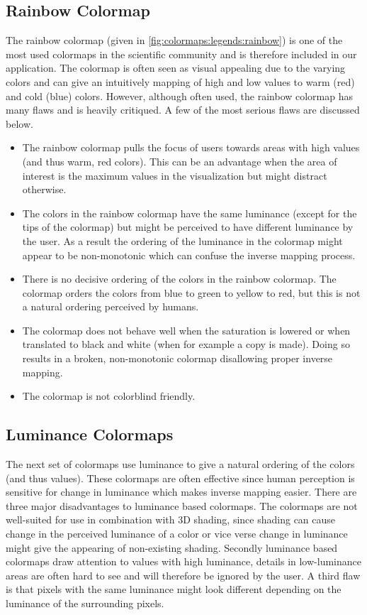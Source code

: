 \subsection{Rainbow Colormap} %
\label{ssub:rainbow_colormap}
The rainbow colormap (given in \cref{fig:colormaps:legends:rainbow}) is one of the most used colormaps in the scientific community and is therefore included in our application. The colormap is often seen as visual appealing due to the varying colors and can give an intuitively mapping of high and low values to warm (red) and cold (blue) colors. However, although often used, the rainbow colormap has many flaws and is heavily critiqued\cite{borland2007rainbow}\cite{divergingMoreland2009}. A few of the most serious flaws are discussed below.
\begin{itemize}
  \item The rainbow colormap pulls the focus of users towards areas with high values (and thus warm, red colors). This can be an advantage when the area of interest is the maximum values in the visualization but might distract otherwise.
  \item The colors in the rainbow colormap have the same luminance (except for the tips of the colormap) but might be perceived to have different luminance by the user. As a result the ordering of the luminance in the colormap might appear to be non-monotonic which can confuse the inverse mapping process.
  \item There is no decisive ordering of the colors in the rainbow colormap. The colormap orders the colors from blue to green to yellow to red, but this is not a natural ordering perceived by humans.
  \item The colormap does not behave well when the saturation is lowered or when translated to black and white (when for example a copy is made). Doing so results in a broken, non-monotonic colormap disallowing proper inverse mapping.
  \item The colormap is not colorblind friendly.
\end{itemize}


\subsection{Luminance Colormaps} %
\label{sub:luminance_colormaps}
The next set of colormaps use luminance to give a natural ordering of the colors (and thus values). These colormaps are often effective since human perception is sensitive for change in luminance\cite{divergingMoreland2009} which makes inverse mapping easier. There are three major disadvantages to luminance based colormaps. The colormaps are not well-suited for use in combination with 3D shading, since shading can cause change in the perceived luminance of a color or vice verse change in luminance might give the appearing of non-existing shading. Secondly luminance based colormaps draw attention to values with high luminance, details in low-luminance areas are often hard to see and will therefore be ignored by the user. A third flaw is that pixels with the same luminance might look different depending on the luminance of the surrounding pixels. 

